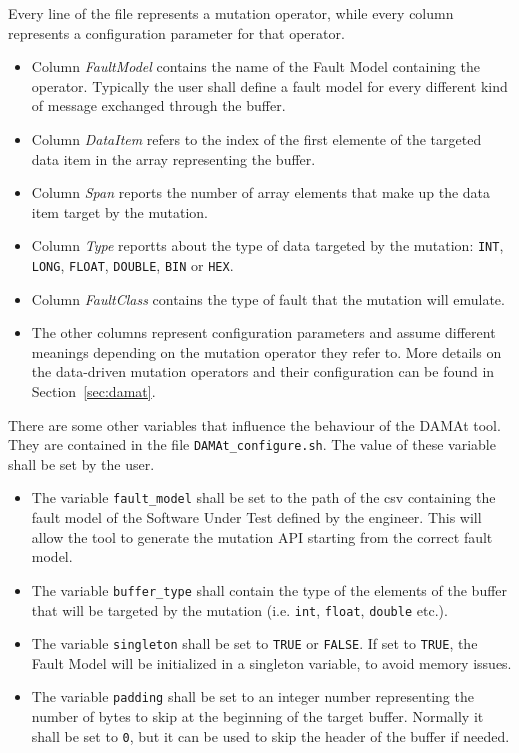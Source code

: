 Every line of the file represents a mutation operator, while every column represents a configuration parameter for that operator.

\begin{itemize}
  \item Column \emph{FaultModel} contains the name of the Fault Model containing the operator. Typically the user shall define a fault model for every different kind of message exchanged through the buffer.

  \item Column \emph{DataItem} refers to the index of the first elemente of the targeted data item in the array representing the buffer.

  \item Column \emph{Span} reports the number of array elements that make up the data item target by the mutation.

  \item Column \emph{Type} reportts about the type of data targeted by the mutation: \texttt{INT}, \texttt{LONG}, \texttt{FLOAT}, \texttt{DOUBLE}, \texttt{BIN} or \texttt{HEX}.

  \item Column \emph{FaultClass} contains the type of fault that the mutation will emulate.

  \item The other columns represent configuration parameters and assume different meanings depending on the mutation operator they refer to. More details on the data-driven mutation operators and their configuration can be found in Section~\ref{sec:damat}.
\end{itemize}

There are some other variables that influence the behaviour of the DAMAt tool.
They are contained in the file \texttt{DAMAt\_configure.sh}. The value of these variable shall be set by the user.

\begin{itemize}
  \item The variable \texttt{fault\_model} shall be set to the path of the csv containing the fault model of the Software Under Test defined by the engineer.
  This will allow the tool to generate the mutation API starting from the correct fault model.
  \item The variable \texttt{buffer\_type} shall contain the type of the elements of the buffer that will be targeted by the mutation (i.e. \texttt{int}, \texttt{float}, \texttt{double} etc.).
  \item The variable \texttt{singleton} shall be set to \texttt{TRUE} or \texttt{FALSE}. If set to \texttt{TRUE}, the Fault Model will be initialized in a singleton variable, to avoid memory issues.
  \item The variable \texttt{padding} shall be set to an integer number representing the number of bytes to skip at the beginning of the target buffer. Normally it shall be set to \texttt{0}, but it can be used to skip the header of the buffer if needed.
\end{itemize}

